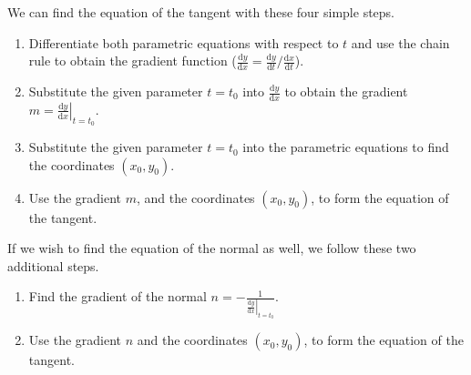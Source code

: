 \documentclass[11pt,a4paper]{book}
\begin{document}
\begin{tcolorbox}[colback=blue!5, colframe=black, boxrule=.4pt, sharpish corners]

We can find the equation of the tangent with these four simple steps.
\begin{enumerate}
\item Differentiate both parametric equations with respect to $t$ and use
the chain rule to obtain the gradient function ($\frac{\mathrm{d}y}{\mathrm{d}x}=\frac{\mathrm{d}y}{\mathrm{d}t}/\frac{\mathrm{d}x}{\mathrm{d}t}$).
\item Substitute the given parameter $t=t_{0}$ into $\frac{\mathrm{d}y}{\mathrm{d}x}$ to
obtain the gradient $m=\left.\frac{\mathrm{d}y}{\mathrm{d}x}\right|_{t=t_{0}}$.
\item Substitute the given parameter $t=t_{0}$ into the parametric equations
to find the coordinates $\left(x_{0},y_{0}\right)$.
\item Use the gradient $m$, and the coordinates $\left(x_{0},y_{0}\right)$,
to form the equation of the tangent.
\end{enumerate}
If we wish to find the equation of the normal as well, we follow these
two additional steps.
\begin{enumerate}
\item Find the gradient of the normal $n=-\frac{1}{\left.\frac{\mathrm{d}y}{\mathrm{d}x}\right|_{t=t_{0}}}$.
\item Use the gradient $n$ and the coordinates $\left(x_{0},y_{0}\right)$,
to form the equation of the tangent.
\end{enumerate}
\end{tcolorbox}
\end{document}
